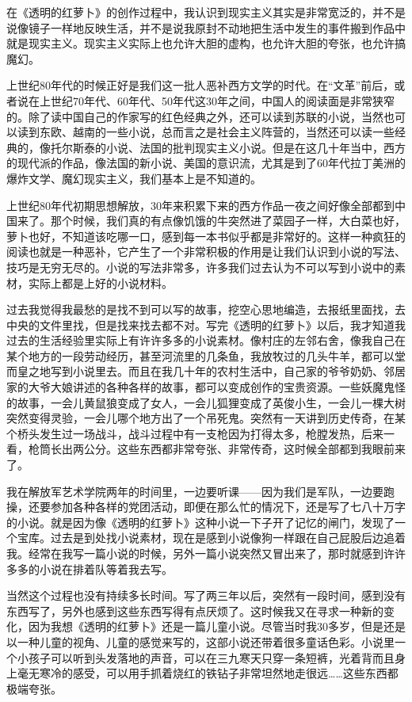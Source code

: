 \documentclass[12pt,a5paper]{ctexbook}
\begin{document}
在《透明的红萝卜》的创作过程中，我认识到现实主义其实是非常宽泛的，并不是说像镜子一样地反映生活，并不是说我原封不动地把生活中发生的事件搬到作品中就是现实主义。现实主义实际上也允许大胆的虚构，也允许大胆的夸张，也允许搞魔幻。

上世纪80年代的时候正好是我们这一批人恶补西方文学的时代。在“文革”前后，或者说在上世纪70年代、60年代、50年代这30年之间，中国人的阅读面是非常狭窄的。除了读中国自己的作家写的红色经典之外，还可以读到苏联的小说，当然也可以读到东欧、越南的一些小说，总而言之是社会主义阵营的，当然还可以读一些经典的，像托尔斯泰的小说、法国的批判现实主义小说。但是在这几十年当中，西方的现代派的作品，像法国的新小说、美国的意识流，尤其是到了60年代拉丁美洲的爆炸文学、魔幻现实主义，我们基本上是不知道的。

上世纪80年代初期思想解放，30年来积累下来的西方作品一夜之间好像全部都到中国来了。那个时候，我们真的有点像饥饿的牛突然进了菜园子一样，大白菜也好，萝卜也好，不知道该吃哪一口，感到每一本书似乎都是非常好的。这样一种疯狂的阅读也就是一种恶补，它产生了一个非常积极的作用是让我们认识到小说的写法、技巧是无穷无尽的。小说的写法非常多，许多我们过去认为不可以写到小说中的素材，实际上都是上好的小说材料。

过去我觉得我最愁的是找不到可以写的故事，挖空心思地编造，去报纸里面找，去中央的文件里找，但是找来找去都不对。写完《透明的红萝卜》以后，我才知道我过去的生活经验里实际上有许许多多的小说素材。像村庄的左邻右舍，像我自己在某个地方的一段劳动经历，甚至河流里的几条鱼，我放牧过的几头牛羊，都可以堂而皇之地写到小说里去。而且在我几十年的农村生活中，自己家的爷爷奶奶、邻居家的大爷大娘讲述的各种各样的故事，都可以变成创作的宝贵资源。一些妖魔鬼怪的故事，一会儿黄鼠狼变成了女人，一会儿狐狸变成了英俊小生，一会儿一棵大树突然变得灵验，一会儿哪个地方出了一个吊死鬼。突然有一天讲到历史传奇，在某个桥头发生过一场战斗，战斗过程中有一支枪因为打得太多，枪膛发热，后来一看，枪筒长出两公分。这些东西都非常夸张、非常传奇，这时候全部都到我眼前来了。

我在解放军艺术学院两年的时间里，一边要听课——因为我们是军队，一边要跑操，还要参加各种各样的党团活动，即便在那么忙的情况下，还是写了七八十万字的小说。就是因为像《透明的红萝卜》这种小说一下子开了记忆的闸门，发现了一个宝库。过去是到处找小说素材，现在是感到小说像狗一样跟在自己屁股后边追着我。经常在我写一篇小说的时候，另外一篇小说突然又冒出来了，那时就感到许许多多的小说在排着队等着我去写。

当然这个过程也没有持续多长时间。写了两三年以后，突然有一段时间，感到没有东西写了，另外也感到这些东西写得有点厌烦了。这时候我又在寻求一种新的变化，因为我想《透明的红萝卜》还是一篇儿童小说。尽管当时我30多岁，但是还是以一种儿童的视角、儿童的感觉来写的，这部小说还带着很多童话色彩。小说里一个小孩子可以听到头发落地的声音，可以在三九寒天只穿一条短裤，光着背而且身上毫无寒冷的感受，可以用手抓着烧红的铁钻子非常坦然地走很远……这些东西都极端夸张。
\end{document}

